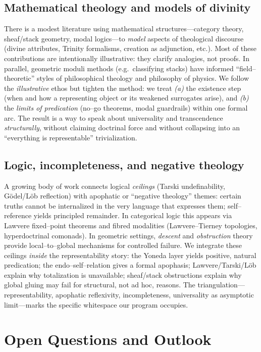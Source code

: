 \documentclass[11pt]{article}
\theoremstyle{upright}
\begin{document}
\subsection{Mathematical theology and models of divinity}\label{subsec:rw-theology}
There is a modest literature using mathematical structures—category theory, sheaf/stack geometry, modal logics—to \emph{model} aspects of theological discourse (divine attributes, Trinity formalisms, creation as adjunction, etc.). Most of these contributions are intentionally illustrative: they clarify analogies, not proofs. In parallel, geometric moduli methods (e.g.\ classifying stacks) have informed “field–theoretic” styles of philosophical theology and philosophy of physics. We follow the \emph{illustrative} ethos but tighten the method: we treat \emph{(a)} the existence step (when and how a representing object or its weakened surrogates arise), and \emph{(b)} the \emph{limits of predication} (no–go theorems, modal guardrails) within one formal arc. The result is a way to speak about universality and transcendence \emph{structurally}, without claiming doctrinal force and without collapsing into an “everything is representable” trivialization.

\subsection{Logic, incompleteness, and negative theology}\label{subsec:rw-incomplete}
A growing body of work connects logical \emph{ceilings} (Tarski undefinability, Gödel/Löb reflection) with apophatic or “negative theology” themes: certain truths cannot be internalized in the very language that expresses them; self–reference yields principled remainder. In categorical logic this appears via Lawvere fixed–point theorems and fibred modalities (Lawvere–Tierney topologies, hyperdoctrinal comonads). In geometric settings, \emph{descent} and \emph{obstruction} theory provide local–to–global mechanisms for controlled failure.
 We integrate these ceilings \emph{inside} the representability story: the Yoneda layer yields positive, natural predication; the endo–self–relation gives a formal apophasis; Lawvere/Tarski/Löb explain why totalization is unavailable; sheaf/stack obstructions explain why global gluing may fail for structural, not ad hoc, reasons. The triangulation—representability, apophatic reflexivity, incompleteness, universality as asymptotic limit—marks the specific whitespace our program occupies.

\section{Open Questions and Outlook}\label{sec:outlook}
\end{document}
